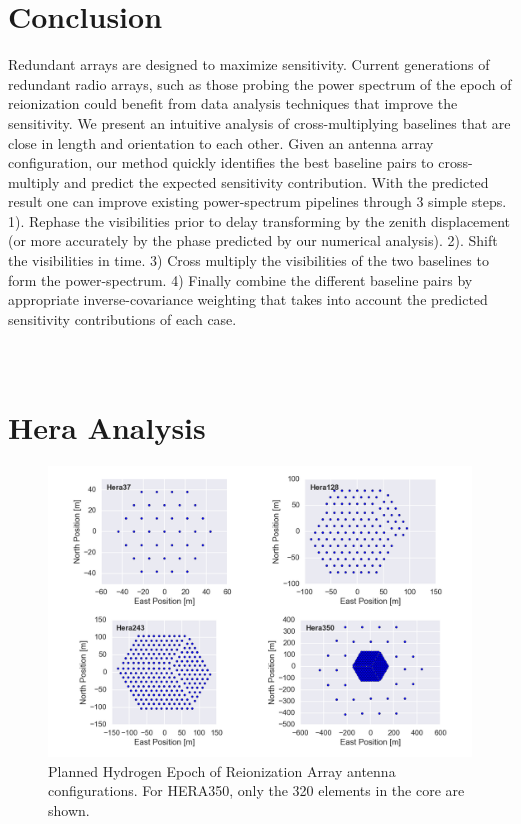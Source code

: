 \documentclass[preprint2,numberedappendix,tighten,twocolappendix]{aastex6}  %
\renewcommand\[{\begin{equation}}
\renewcommand\]{\end{equation}}
\begin{document}
\section{Conclusion}
Redundant arrays are designed to maximize sensitivity. Current generations of redundant radio arrays, such as those probing the power spectrum of the epoch of reionization could benefit from data analysis techniques that improve the sensitivity. We present an intuitive analysis of cross-multiplying baselines that are close in length and orientation to each other. Given an antenna array configuration, our method quickly identifies the best baseline pairs to cross-multiply and predict the expected sensitivity contribution. With the predicted result one can improve existing power-spectrum pipelines through 3 simple steps. 1). Rephase the visibilities prior to delay transforming by the zenith displacement (or more accurately by the phase predicted by our numerical analysis). 2). Shift the visibilities in time. 3) Cross multiply the visibilities of the two baselines  to form the power-spectrum. 4) Finally combine the different baseline pairs by appropriate inverse-covariance weighting that takes into account the predicted sensitivity contributions of each case. 

\appendix
\section{\\Hera Analysis}
\begin{widetext}
\begin{figure}[H]
\includegraphics[scale=0.55]{HeraAntpos}

\caption{Planned Hydrogen Epoch of Reionization Array antenna configurations. For HERA350, only the 320 elements in the core are shown. \label{fig:HeraAntpos}}
\end{figure}
\end{widetext}
\end{document}
